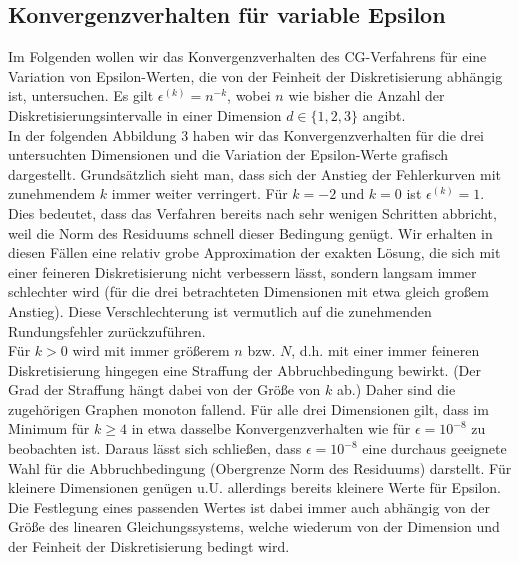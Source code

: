 \documentclass{scrartcl}
\begin{document}
\subsection{Konvergenzverhalten für variable Epsilon}
Im Folgenden wollen wir das Konvergenzverhalten des CG-Verfahrens für eine Variation von Epsilon-Werten, die von der Feinheit der Diskretisierung abhängig ist, untersuchen. 
Es gilt $\epsilon^{(k)}=n^{-k}$, wobei $n$ wie bisher die Anzahl der Diskretisierungsintervalle in einer Dimension $d\in\{1, 2, 3\}$ angibt. \\
In der folgenden Abbildung 3 haben wir das Konvergenzverhalten für die drei untersuchten Dimensionen und die Variation der Epsilon-Werte grafisch dargestellt. 
Grundsätzlich sieht man, dass sich der Anstieg der Fehlerkurven mit zunehmendem $k$ immer weiter verringert. 
Für $k=-2$ und $k=0$ ist $\epsilon^{(k)}=1$. 
Dies bedeutet, dass das Verfahren bereits nach sehr wenigen Schritten abbricht, weil die Norm des Residuums schnell dieser Bedingung genügt. 
Wir erhalten in diesen Fällen eine relativ grobe Approximation der exakten Lösung, die sich mit einer feineren Diskretisierung nicht verbessern lässt, sondern langsam immer schlechter wird (für die drei betrachteten Dimensionen mit etwa gleich großem Anstieg). 
Diese Verschlechterung ist vermutlich auf die zunehmenden Rundungsfehler zurückzuführen. \\
Für $k>0$ wird mit immer größerem $n$ bzw. $N$, d.h. mit einer immer feineren Diskretisierung hingegen eine Straffung der Abbruchbedingung bewirkt. 
(Der Grad der Straffung hängt dabei von der Größe von $k$ ab.) 
Daher sind die zugehörigen Graphen monoton fallend. 
Für alle drei Dimensionen gilt, dass im Minimum für $k\geq4$ in etwa dasselbe Konvergenzverhalten wie für $\epsilon = 10^{-8}$ zu beobachten ist. 
Daraus lässt sich schließen, dass $\epsilon = 10^{-8}$ eine durchaus geeignete Wahl für die Abbruchbedingung (Obergrenze Norm des Residuums) darstellt. 
Für kleinere Dimensionen genügen u.U. allerdings bereits kleinere Werte für Epsilon. 
Die Festlegung eines passenden Wertes ist dabei immer auch abhängig von der Größe des linearen Gleichungssystems, welche wiederum von der Dimension und der Feinheit der Diskretisierung bedingt wird. \\
\end{document}
